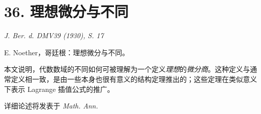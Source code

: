 \section*{36. 理想微分与不同}

\begin{center}
\emph{J. Ber. d. DMV39 (1930), S. 17}
\end{center}

E. Noether，哥廷根：理想微分与不同。

本文说明，代数数域的不同如何可被理解为一个定义\emph{理想}的\emph{微分商}。这种定义与通常定义相一致，是由一些本身也很有意义的结构定理推出的；这些定理在类似意义下表示 Lagrange 插值公式的推广。

详细论述将发表于 \emph{Math. Ann.}

\clearpage
\setcounter{footnote}{0}

